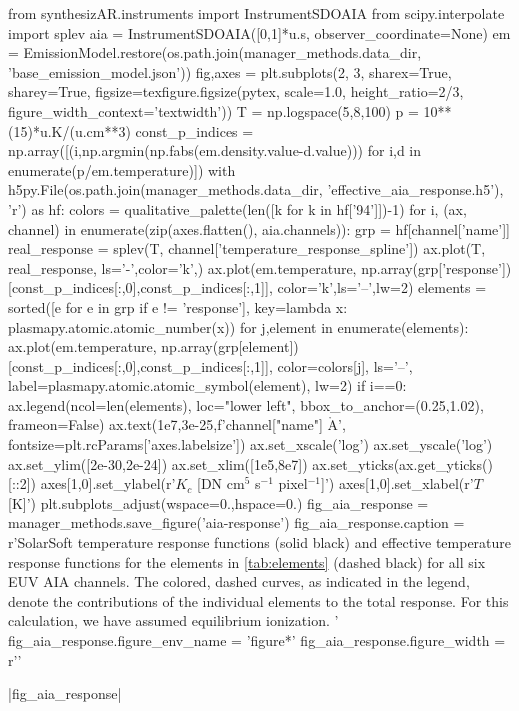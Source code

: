 \begin{pycode}
from synthesizAR.instruments import InstrumentSDOAIA
from scipy.interpolate import splev
aia = InstrumentSDOAIA([0,1]*u.s, observer_coordinate=None)
em = EmissionModel.restore(os.path.join(manager_methods.data_dir, 'base_emission_model.json'))
fig,axes = plt.subplots(2, 3, sharex=True, sharey=True,
                        figsize=texfigure.figsize(pytex, scale=1.0, height_ratio=2/3,       
                                                  figure_width_context='textwidth'))
T = np.logspace(5,8,100)
p = 10**(15)*u.K/(u.cm**3)
const_p_indices = np.array([(i,np.argmin(np.fabs(em.density.value-d.value))) 
                            for i,d in enumerate(p/em.temperature)])
with h5py.File(os.path.join(manager_methods.data_dir, 'effective_aia_response.h5'), 'r') as hf:
    colors = qualitative_palette(len([k for k in hf['94']])-1)
    for i, (ax, channel) in enumerate(zip(axes.flatten(), aia.channels)):
        grp = hf[channel['name']]
        real_response = splev(T, channel['temperature_response_spline'])
        ax.plot(T, real_response, ls='-',color='k',)
        ax.plot(em.temperature, 
                np.array(grp['response'])[const_p_indices[:,0],const_p_indices[:,1]],
                color='k',ls='--',lw=2)
        elements = sorted([e for e in grp if e != 'response'],
                          key=lambda x: plasmapy.atomic.atomic_number(x))
        for j,element in enumerate(elements):
            ax.plot(em.temperature, 
                    np.array(grp[element])[const_p_indices[:,0],const_p_indices[:,1]],
                    color=colors[j], ls='--', label=plasmapy.atomic.atomic_symbol(element), 
                    lw=2)
        if i==0:
            ax.legend(ncol=len(elements), loc="lower left", bbox_to_anchor=(0.25,1.02),
                      frameon=False)
        ax.text(1e7,3e-25,f'{channel["name"]} $\mathrm{{\mathring{{A}}}}$',
                fontsize=plt.rcParams['axes.labelsize'])
ax.set_xscale('log')
ax.set_yscale('log')
ax.set_ylim([2e-30,2e-24])
ax.set_xlim([1e5,8e7])
ax.set_yticks(ax.get_yticks()[::2])
axes[1,0].set_ylabel(r'$K_c$ [DN cm$^5$ s$^{-1}$ pixel$^{-1}$]')
axes[1,0].set_xlabel(r'$T$ [K]')
plt.subplots_adjust(wspace=0.,hspace=0.)
fig_aia_response = manager_methods.save_figure('aia-response')
fig_aia_response.caption = r'SolarSoft temperature response functions (solid black) and effective temperature response functions for the elements in \autoref{tab:elements} (dashed black) for all six EUV AIA channels. The colored, dashed curves, as indicated in the legend, denote the contributions of the individual elements to the total response. For this calculation, we have assumed equilibrium ionization. '
fig_aia_response.figure_env_name = 'figure*'
fig_aia_response.figure_width = r'\textwidth'
\end{pycode}
|fig_aia_response|

